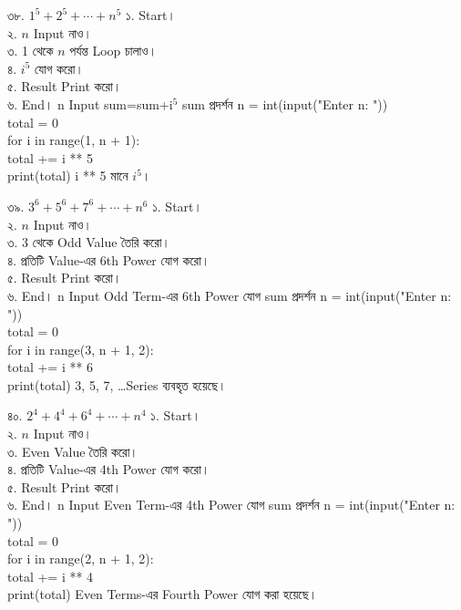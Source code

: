 
\exerciseTable
{৩৮. \(1^5+2^5+\cdots+n^5\)}
{
১. Start।\\
২. \(n\) Input নাও।\\
৩. 1 থেকে \(n\) পর্যন্ত Loop চালাও।\\
৪. \(i^5\) যোগ করো।\\
৫. Result Print করো।\\
৬. End।
}
{
\linearflow
{n Input}
{sum=sum+i\(^5\)}
{sum প্রদর্শন}
}
{
n = int(input("Enter n: "))\\
total = 0\\
for i in range(1, n + 1):\\
\hspace*{4mm}total += i ** 5\\
print(total)
}
{
\textenglish{\ttfamily i ** 5}
মানে \(i^5\)।
}


\exerciseTable
{৩৯. \(3^6+5^6+7^6+\cdots+n^6\)}
{
১. Start।\\
২. \(n\) Input নাও।\\
৩. 3 থেকে Odd Value তৈরি করো।\\
৪. প্রতিটি Value-এর 6th Power যোগ করো।\\
৫. Result Print করো।\\
৬. End।
}
{
\linearflow
{n Input}
{Odd Term-এর 6th Power যোগ}
{sum প্রদর্শন}
}
{
n = int(input("Enter n: "))\\
total = 0\\
for i in range(3, n + 1, 2):\\
\hspace*{4mm}total += i ** 6\\
print(total)
}
{
3, 5, 7, \dots Series ব্যবহৃত হয়েছে।
}


\exerciseTable
{৪০. \(2^4+4^4+6^4+\cdots+n^4\)}
{
১. Start।\\
২. \(n\) Input নাও।\\
৩. Even Value তৈরি করো।\\
৪. প্রতিটি Value-এর 4th Power যোগ করো।\\
৫. Result Print করো।\\
৬. End।
}
{
\linearflow
{n Input}
{Even Term-এর 4th Power যোগ}
{sum প্রদর্শন}
}
{
n = int(input("Enter n: "))\\
total = 0\\
for i in range(2, n + 1, 2):\\
\hspace*{4mm}total += i ** 4\\
print(total)
}
{
Even Terms-এর Fourth Power যোগ করা হয়েছে।
}

